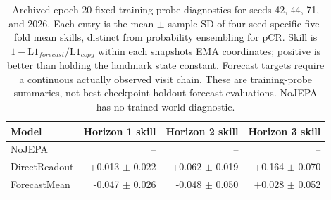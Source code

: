 \begin{table}[t]
\centering
\small
\caption{Archived epoch 20 fixed-training-probe diagnostics for seeds 42, 44, 71, and 2026. Each entry is the mean $\pm$ sample SD of four seed-specific five-fold mean skills, distinct from probability ensembling for pCR. Skill is $1-\mathrm{L1}_{forecast}/\mathrm{L1}_{copy}$ within each snapshot\textquotesingle s EMA coordinates; positive is better than holding the landmark state constant. Forecast targets require a continuous actually observed visit chain. These are training-probe summaries, not best-checkpoint holdout forecast evaluations. NoJEPA has no trained-world diagnostic.}
\label{tab:worldprobe}
\begin{tabular}{lrrr}
\toprule
Model & Horizon 1 skill & Horizon 2 skill & Horizon 3 skill \\
\midrule
NoJEPA & -- & -- & -- \\
DirectReadout & +0.013 $\pm$ 0.022 & +0.062 $\pm$ 0.019 & +0.164 $\pm$ 0.070 \\
ForecastMean & -0.047 $\pm$ 0.026 & -0.048 $\pm$ 0.050 & +0.028 $\pm$ 0.052 \\
\bottomrule
\end{tabular}
\end{table}
